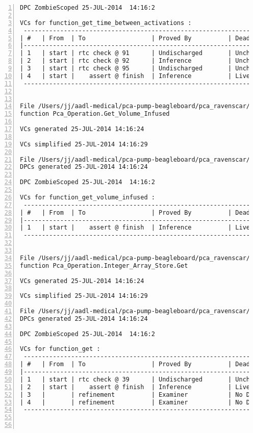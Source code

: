 \begin{lstlisting}[gobble=0, numbers=left, caption={POGS report for PCA Pump prototype}, label={listing:pca_ravenscar:pogs_full}]
DPC ZombieScoped 25-JUL-2014  14:16:2

VCs for function_get_time_between_activations :
 -----------------------------------------------------------------------------
| #   | From  | To                  | Proved By          | Dead Path | Status |
|-----------------------------------------------------------------------------
| 1   | start | rtc check @ 91      | Undischarged       | Unchecked |   UU   |
| 2   | start | rtc check @ 92      | Inference          | Unchecked |   IU   |
| 3   | start | rtc check @ 95      | Undischarged       | Unchecked |   UU   |
| 4   | start |    assert @ finish  | Inference          | Live      |   IL   |
 -----------------------------------------------------------------------------


File /Users/jj/aadl-medical/pca-pump-beagleboard/pca_ravenscar/pca_operation/get_volume_infused.vcg
function Pca_Operation.Get_Volume_Infused

VCs generated 25-JUL-2014 14:16:24

VCs simplified 25-JUL-2014 14:16:29

File /Users/jj/aadl-medical/pca-pump-beagleboard/pca_ravenscar/pca_operation/get_volume_infused.dpc
DPCs generated 25-JUL-2014 14:16:24

DPC ZombieScoped 25-JUL-2014  14:16:2

VCs for function_get_volume_infused :
 -----------------------------------------------------------------------------
| #   | From  | To                  | Proved By          | Dead Path | Status |
|-----------------------------------------------------------------------------
| 1   | start |    assert @ finish  | Inference          | Live      |   IL   |
 -----------------------------------------------------------------------------


File /Users/jj/aadl-medical/pca-pump-beagleboard/pca_ravenscar/pca_operation/integer_array_store/get.vcg
function Pca_Operation.Integer_Array_Store.Get

VCs generated 25-JUL-2014 14:16:24

VCs simplified 25-JUL-2014 14:16:29

File /Users/jj/aadl-medical/pca-pump-beagleboard/pca_ravenscar/pca_operation/integer_array_store/get.dpc
DPCs generated 25-JUL-2014 14:16:24

DPC ZombieScoped 25-JUL-2014  14:16:2

VCs for function_get :
 -----------------------------------------------------------------------------
| #   | From  | To                  | Proved By          | Dead Path | Status |
|-----------------------------------------------------------------------------
| 1   | start | rtc check @ 39      | Undischarged       | Unchecked |   UU   |
| 2   | start |    assert @ finish  | Inference          | Live      |   IL   |
| 3   |       | refinement          | Examiner           | No DPC    |   E-   |
| 4   |       | refinement          | Examiner           | No DPC    |   E-   |
 -----------------------------------------------------------------------------



\end{lstlisting}
